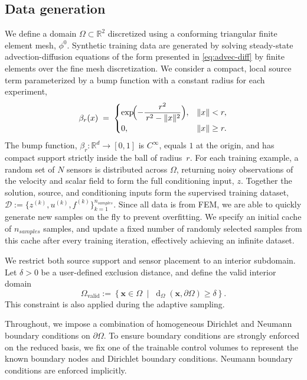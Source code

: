 \documentclass[onefignum,onetabnum]{siamart171218} %
\begin{document}
\subsection{Data generation}
\label{sec:data_gen}
We define a domain $\Omega \subset \mathbb{R}^2$ discretized using a conforming triangular finite element mesh, $\phi^0$. Synthetic training data are generated by solving steady-state advection-diffusion equations of the form presented in \eqref{eq:advec-diff} by finite elements over the fine mesh discretization. We consider a compact, local source term parameterized by a bump function with a constant radius for each experiment,
\begin{equation}
    \beta_r(x)\;=\;
    \begin{cases}
        \displaystyle
        \exp\!\Bigl(-\dfrac{r^{2}}{\,r^{2}-\|x\|^{2}}\Bigr),
        & \|x\|<r,\\[1.2ex]
        0,
        & \|x\|\ge r.
    \end{cases}
\end{equation}
\noindent The bump function,  $\beta_r:\mathbb{R}^{d}\to[0,1]$ is $C^\infty$, equals $1$ at the origin, and has compact
support strictly inside the ball of radius~$r$.
For each training example, a random set of $N$ sensors is distributed across $\Omega$, returning noisy observations of the velocity and scalar field to form the full conditioning input, $z$. Together the solution, source, and conditioning inputs form the supervised training dataset, $\mathcal{D}:=\{z^{(k)}, u^{(k)}, f^{(k)}\}_{k=1}^{n_{samples}}$. Since all data is from FEM, we are able to quickly generate new samples on the fly to prevent overfitting. We specify an initial cache of $n_{samples}$ samples, and update a fixed number of randomly selected samples from this cache after every training iteration, effectively achieving an infinite dataset.

We restrict both source support and sensor placement to an interior subdomain. Let \( \delta > 0 \) be a user-defined exclusion distance, and define the valid interior domain
\[
    \Omega_{\mathrm{valid}} := \left\{ \mathbf{x} \in \Omega \;\middle|\; \operatorname{d}_\Omega(\mathbf{x}, \partial\Omega) \geq \delta \right\}.
\]
This constraint is also applied during the adaptive sampling.

Throughout, we impose a combination of homogeneous Dirichlet and Neumann boundary conditions on \( \partial\Omega \).
To ensure boundary conditions are strongly enforced on the reduced basis, we fix one of the trainable control volumes to represent the known boundary nodes and Dirichlet boundary conditions. Neumann boundary conditions are enforced implicitly.
\end{document}
